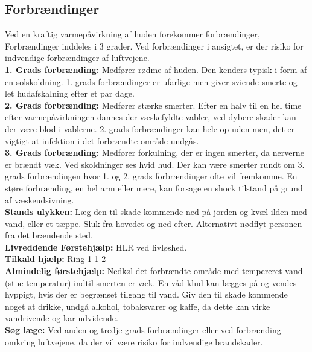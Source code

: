 \documentclass[../../../main.tex]{subfiles}
\begin{document}
\begin{multicols}{2}
\subsection*{Forbrændinger} Ved en kraftig varmepåvirkning af huden
forekommer forbrændinger, Forbrændinger inddeles i 3 grader. Ved forbrændinger i ansigtet, er der risiko for indvendige forbrændinger af luftvejene.
\\

\textbf{1. Grads forbrænding:} Medfører rødme af huden. Den kenders typisk i form af en solskoldning. 1. grads forbrændinger er ufarlige men giver sviende smerte og let hudafskalning efter et par dage.
\\

\textbf{2. Grads forbrænding:} Medfører stærke smerter. Efter en halv til en hel time efter varmepåvirkningen dannes der væskefyldte vabler, ved dybere skader kan der være blod i vablerne. 2. grads forbrændinger kan hele op uden men, det er vigtigt at infektion i det forbrændte område undgås.
\\

\textbf{3. Grads forbrænding:} Medfører forkulning, der er ingen smerter, da nerverne er brændt væk. Ved skoldninger ses hvid hud. Der kan være smerter rundt om 3. grads forbrændingen hvor 1. og 2. grads forbrændinger ofte vil fremkomme. En støre forbrænding, en hel arm eller mere, kan forsage en shock tilstand på grund af væskeudsivning. 
\\

\textbf{Stands ulykken:} Læg den til skade kommende ned på jorden og kvæl
ilden med vand, eller et tæppe. Sluk fra hovedet og ned efter. Alternativt nødflyt personen fra det brændende sted.
\\

\textbf{Livreddende Førstehjælp:} HLR ved livløshed.
\\

\textbf{Tilkald hjælp:} Ring 1-1-2
\\

\textbf{Almindelig førstehjælp:} Nedkøl det forbrændte område med tempereret vand (stue temperatur) indtil smerten er væk. En våd klud kan lægges på og vendes hyppigt, hvis der er begrænset tilgang til vand. Giv den til skade kommende noget at drikke, undgå alkohol, tobaksvarer og kaffe, da dette kan virke vandrivende og kar udvidende.
\\

\textbf{Søg læge:} Ved anden og tredje grads forbrændinger eller ved forbrænding omkring luftvejene, da der vil være risiko for indvendige brandskader. 
\\

\end{multicols}
\end{document}
